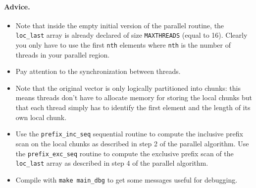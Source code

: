 \documentclass{article}
\begin{document}
\paragraph{Advice.}
\begin{itemize}
\item Note that inside the empty initial version of the parallel
  routine, the \texttt{loc\_last} array is already declared of size
  \texttt{MAXTHREADS} (equal to 16). Clearly you only have to use the
  first \texttt{nth} elements where \texttt{nth} is the number of
  threads in your parallel region.
\item Pay attention to the synchronization between threads.
\item Note that the original vector is only logically partitioned into
  chunks: this means threads don't have to allocate memory for storing
  the local chunks but that each thread simply has to identify the
  first element and the length of its own local chunk.
\item Use the \texttt{prefix\_inc\_seq} sequential routine to compute
  the inclusive prefix scan on the local chunks as described in step 2
  of the parallel algorithm. Use the \texttt{prefix\_exc\_seq} routine
  to compute the exclusive prefix scan of the \texttt{loc\_last} array
  as described in step 4 of the parallel algorithm.
\item Compile with \texttt{make main\_dbg} to get some messages useful
  for debugging.
\end{itemize}
\end{document}
